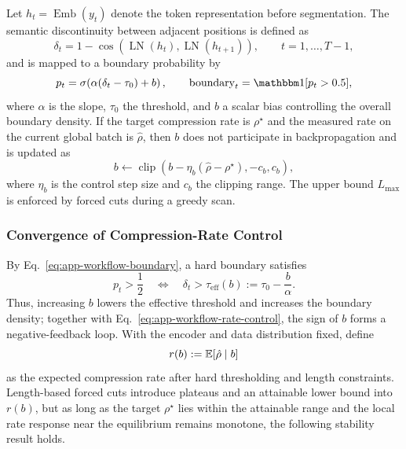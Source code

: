 Let $h_t=\operatorname{Emb}(y_t)$ denote the token representation before segmentation. The semantic discontinuity between adjacent positions is defined as
\begin{equation}
    \delta_t
    =1-\cos\!\left(\operatorname{LN}(h_t),\operatorname{LN}(h_{t+1})\right),
    \qquad t=1,\ldots,T-1,
    \label{eq:app-workflow-delta}
\end{equation}
and is mapped to a boundary probability by
\begin{equation}
    p_t
    =\sigma\!\left(\alpha(\delta_t-\tau_0)+b\right),
    \qquad
    \operatorname{boundary}_t=\ind[p_t>0.5],
    \label{eq:app-workflow-boundary}
\end{equation}
where $\alpha$ is the slope, $\tau_0$ the threshold, and $b$ a scalar bias controlling the overall boundary density. If the target compression rate is $\rho^\star$ and the measured rate on the current global batch is $\hat\rho$, then $b$ does not participate in backpropagation and is updated as
\begin{equation}
    b\leftarrow
    \operatorname{clip}\!\left(
      b-\eta_b(\hat\rho-\rho^\star),-c_b,c_b
    \right),
    \label{eq:app-workflow-rate-control}
\end{equation}
where $\eta_b$ is the control step size and $c_b$ the clipping range. The upper bound $L_{\max}$ is enforced by forced cuts during a greedy scan.

\subsubsection{Convergence of Compression-Rate Control}
\label{app:rate-convergence}
By Eq.~\eqref{eq:app-workflow-boundary}, a hard boundary satisfies
\begin{equation}
    p_t>\frac12
    \quad\Longleftrightarrow\quad
    \delta_t>\tau_{\mathrm{eff}}(b)
    :=\tau_0-\frac{b}{\alpha}.
    \label{eq:app-effective-threshold}
\end{equation}
Thus, increasing $b$ lowers the effective threshold and increases the boundary density; together with Eq.~\eqref{eq:app-workflow-rate-control}, the sign of $b$ forms a negative-feedback loop. With the encoder and data distribution fixed, define
\begin{equation}
    r(b):=\mathbb{E}[\hat\rho\mid b]
    \label{eq:app-rate-response}
\end{equation}
as the expected compression rate after hard thresholding and length constraints. Length-based forced cuts introduce plateaus and an attainable lower bound into $r(b)$, but as long as the target $\rho^\star$ lies within the attainable range and the local rate response near the equilibrium remains monotone, the following stability result holds.

